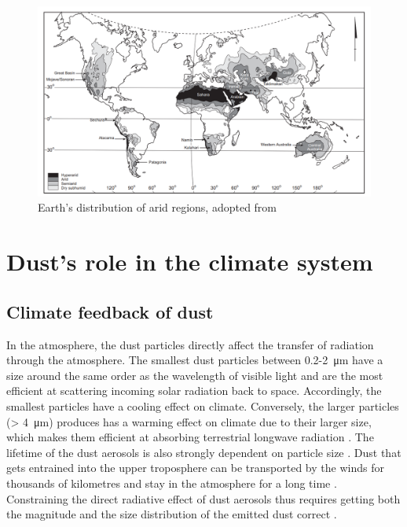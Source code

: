 \begin{figure}[htpb]
    \centering
    \includegraphics[width=\textwidth]{texfiles/figs/Desert_distrubtion.PNG}
    \caption{Earth's distribution of arid regions, adopted from \textcite{williams_climate_2014}}
    \label{fig:desert_distrubtion}
\end{figure}

\section{Dust's role in the climate system}\label{seq:physics_of_dust}
\subsection{Climate feedback of dust}
 
In the atmosphere, the dust particles directly affect the transfer of radiation through the atmosphere. 
The smallest dust particles between 0.2-\SI{2}{\micro\metre} have a size around the same order as the wavelength of visible light and are the most efficient at scattering incoming solar radiation back to space. 
Accordingly, the smallest particles have a cooling effect on climate. 
Conversely, the larger particles (> \SI{4}{\micro\metre}) produces has a warming effect on climate due to their larger size, which makes them efficient at absorbing terrestrial longwave radiation \parencite{choobari2014global}.
The lifetime of the dust aerosols is also strongly dependent on particle size \parencite{mahowald2014size}. Dust that gets entrained into the upper troposphere can be transported by the winds for thousands of kilometres and stay in the atmosphere for a long time \parencite{yumimoto_elevated_2009}. Constraining the direct radiative effect of dust aerosols thus requires getting both the magnitude and the size distribution of the emitted dust correct \parencite{adebiyi2020dust}.

